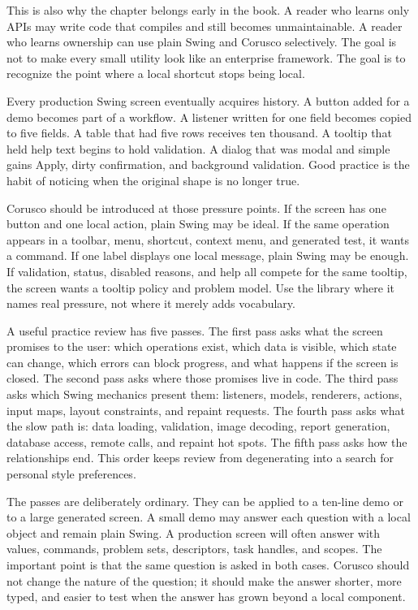 This is also why the chapter belongs early in the book. A reader who learns
only APIs may write code that compiles and still becomes unmaintainable. A
reader who learns ownership can use plain Swing and Corusco selectively. The
goal is not to make every small utility look like an enterprise framework. The
goal is to recognize the point where a local shortcut stops being local.

Every production Swing screen eventually acquires history. A button added for a
demo becomes part of a workflow. A listener written for one field becomes copied
to five fields. A table that had five rows receives ten thousand. A tooltip that
held help text begins to hold validation. A dialog that was modal and simple
gains Apply, dirty confirmation, and background validation. Good practice is the
habit of noticing when the original shape is no longer true.

Corusco should be introduced at those pressure points. If the screen has one
button and one local action, plain Swing may be ideal. If the same operation
appears in a toolbar, menu, shortcut, context menu, and generated test, it wants
a command. If one label displays one local message, plain Swing may be enough.
If validation, status, disabled reasons, and help all compete for the same
tooltip, the screen wants a tooltip policy and problem model. Use the library
where it names real pressure, not where it merely adds vocabulary.

A useful practice review has five passes. The first pass asks what the screen
promises to the user: which operations exist, which data is visible, which
state can change, which errors can block progress, and what happens if the
screen is closed. The second pass asks where those promises live in code. The
third pass asks which Swing mechanics present them: listeners, models,
renderers, actions, input maps, layout constraints, and repaint requests. The
fourth pass asks what the slow path is: data loading, validation, image
decoding, report generation, database access, remote calls, and repaint hot
spots. The fifth pass asks how the relationships end. This order keeps review
from degenerating into a search for personal style preferences.

The passes are deliberately ordinary. They can be applied to a ten-line demo or
to a large generated screen. A small demo may answer each question with a local
object and remain plain Swing. A production screen will often answer with
values, commands, problem sets, descriptors, task handles, and scopes. The
important point is that the same question is asked in both cases. Corusco should
not change the nature of the question; it should make the answer shorter, more
typed, and easier to test when the answer has grown beyond a local component.

